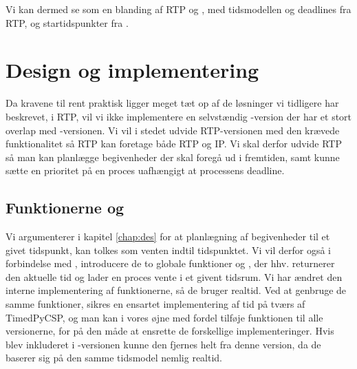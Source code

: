 Vi kan dermed se \is som en blanding af RTP og \des, med tidsmodellen og deadlines fra RTP, og startidspunkter fra \des. 



\section{Design og implementering} 

Da kravene til \is rent praktisk ligger meget tæt op af de løsninger vi tidligere har beskrevet, i RTP, vil vi ikke implementere en selvstændig \code{\ip}-version der har et stort overlap med -versionen. Vi vil i stedet udvide RTP-versionen med den krævede funktionalitet så RTP kan foretage både RTP og IP.
Vi skal derfor udvide RTP så man kan planlægge begivenheder der skal foregå ud i fremtiden, samt kunne sætte en prioritet på en proces uafhængigt at processens deadline. 


\subsection{Funktionerne  og }

Vi argumenterer i kapitel \ref{chap:des} for at planlægning af begivenheder til et givet tidspunkt, kan tolkes som venten indtil tidspunktet. Vi vil derfor også i forbindelse med \ip, introducere de to globale funktioner  og , der hhv. returnerer den aktuelle tid og lader en proces vente i et givent tidsrum. Vi har ændret den interne implementering af funktionerne, så de bruger realtid. Ved at genbruge de samme funktioner, sikres en ensartet implementering af tid på tværs af TimedPyCSP, og man kan i vores øjne med fordel tilføje funktionen  til alle \pycsp versionerne, for på den måde at ensrette de forskellige implementeringer. Hvis  blev inkluderet i -versionen kunne den fjernes helt fra denne version, da de baserer sig på den samme tidsmodel nemlig realtid.


